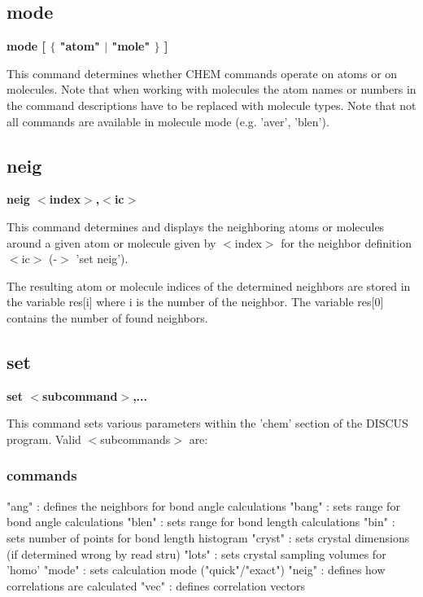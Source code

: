 \subsection*{mode}
{\bf mode [ $ \{$ "atom" $| $ "mole" $\} $ ] \par }
\par
\vspace{3pt}
This command determines whether CHEM commands operate on atoms 
or on molecules. Note that when working with molecules the atom 
names or numbers in the command descriptions have to be replaced 
with molecule types. Note that not all commands are available 
in molecule mode (e.g. 'aver', 'blen'). 
\subsection*{neig}
{\bf neig $ <$index$> $,$ <$ic$> $ \par }
\par
\vspace{3pt}
This command determines and displays the neighboring atoms or 
molecules around a given atom or molecule given by $ <$index$> $ for 
the neighbor definition $ <$ic$> $ (-$> $ 'set neig'). 
\par
The resulting atom or molecule indices of the determined neighbors 
are stored in the variable res[i] where i is the number of the 
neighbor. The variable res[0] contains the number of found 
neighbors. 
\subsection*{set}
{\bf set $ <$subcommand$> $,... \par }
\par
\vspace{3pt}
This command sets various parameters within the 'chem' section of 
the DISCUS program. Valid $ <$subcommands$> $ are: 
\par
\subsubsection{commands}
\begin{MacVerbatim}
"ang"     : defines the neighbors for bond angle calculations
"bang"    : sets range for bond angle calculations
"blen"    : sets range for bond length calculations
"bin"     : sets number of points for bond length histogram
"cryst"   : sets crystal dimensions (if determined wrong by read stru)
"lots"    : sets crystal sampling volumes for 'homo'
"mode"    : sets calculation mode ("quick"/"exact")
"neig"    : defines how correlations are calculated
"vec"     : defines correlation vectors
\end{MacVerbatim}
